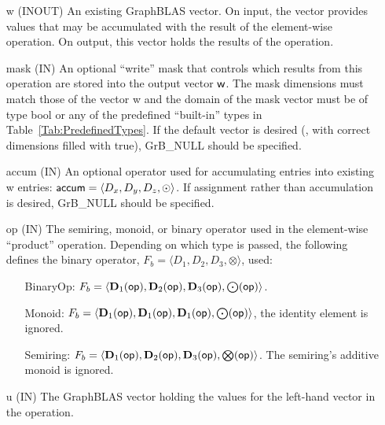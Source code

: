 \begin{itemize}[leftmargin=1.1in]
    \item[{\sf w}]    ({\sf INOUT}) An existing GraphBLAS vector.  On input,
    the vector provides values that may be accumulated with the result of the
    element-wise operation.  On output, this vector holds the results of the
    operation.

    \item[{\sf mask}] ({\sf IN}) An optional ``write'' mask that controls which
    results from this operation are stored into the output vector ${\sf w}$. The 
    mask dimensions must match those of the vector {\sf w} and the domain of the
    {\sf mask} vector must be of type {\sf bool} or any of the predefined 
    ``built-in'' types in Table~\ref{Tab:PredefinedTypes}.  If the default vector
    is desired (\ie, with correct dimensions filled with {\sf true}), 
    {\sf GrB\_NULL} should be specified.

    \item[{\sf accum}] ({\sf IN}) An optional operator used for accumulating
    entries into existing {\sf w} entries: ${\sf accum} = \langle D_x,
    D_y, D_z,\odot \rangle$. If assignment rather than accumulation is
    desired, {\sf GrB\_NULL} should be specified.

    \item[{\sf op}]    ({\sf IN}) The semiring, monoid, or binary operator 
    used in the element-wise ``product'' operation.  Depending on which type is
    passed, the following defines the binary operator, $F_b=\langle D_1,D_2,D_3,\otimes\rangle$, used:
    \begin{itemize}[leftmargin=1.1in]
    \item[BinaryOp:] $F_b = \langle \bold{D}_1({\sf op}), \bold{D}_2({\sf op}),
    \bold{D}_3({\sf op}),\bold{\bigodot}({\sf op})\rangle$.  
    \item[Monoid:] $F_b = \langle \bold{D}_1({\sf op}), \bold{D}_1({\sf op}),
    \bold{D}_1({\sf op}),\bold{\bigodot}({\sf op})\rangle$,
    the identity element is ignored. 
    \item[Semiring:] $F_b = \langle \bold{D}_1({\sf op}), \bold{D}_2({\sf op}),
    \bold{D}_3({\sf op}),\bold{\bigotimes}({\sf op})\rangle$.  The semiring's
    additive monoid is ignored.
    \end{itemize}
    
    \item[{\sf u}]     ({\sf IN}) The GraphBLAS vector holding the values for
    the left-hand vector in the operation.
    

\end{itemize}
